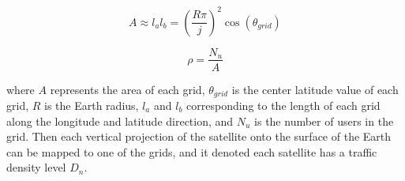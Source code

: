 \begin{equation}
 A \approx l_{a} l_{b}=\left(\frac{R \pi}{j}\right)^{2} \cos \left(\theta_{g r i d}\right) 
\end{equation}

\begin{equation}
 \rho=\frac{N_{u}}{A} 
\end{equation}

where $A$ represents the area of each grid, $\theta_{grid}$ is the center latitude value of each grid, $R$ is the Earth radius, $l_{a}$ and $l_{b}$ corresponding to the length of each grid along the longitude and latitude direction, and $N_u$ is the number of users in the grid. Then each vertical projection of the satellite onto the surface of the Earth can be mapped to one of the grids, and it denoted each satellite has a traffic density level $D_n$.